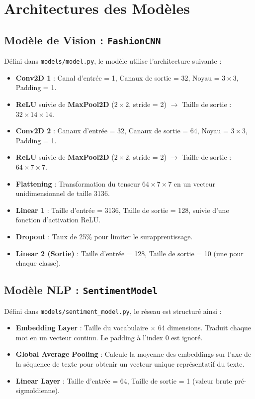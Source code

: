 \documentclass[12pt,a4paper,oneside]{report}
\begin{document}
\section{Architectures des Modèles}

\subsection{Modèle de Vision : \texttt{FashionCNN}}
Défini dans \texttt{models/model.py}, le modèle utilise l'architecture suivante :
\begin{itemize}
    \item \textbf{Conv2D 1} : Canal d'entrée = 1, Canaux de sortie = 32, Noyau = $3\times3$, Padding = 1.
    \item \textbf{ReLU} suivie de \textbf{MaxPool2D} ($2\times2$, stride = 2) $\to$ Taille de sortie : $32 \times 14 \times 14$.
    \item \textbf{Conv2D 2} : Canaux d'entrée = 32, Canaux de sortie = 64, Noyau = $3\times3$, Padding = 1.
    \item \textbf{ReLU} suivie de \textbf{MaxPool2D} ($2\times2$, stride = 2) $\to$ Taille de sortie : $64 \times 7 \times 7$.
    \item \textbf{Flattening} : Transformation du tenseur $64 \times 7 \times 7$ en un vecteur unidimensionnel de taille 3136.
    \item \textbf{Linear 1} : Taille d'entrée = 3136, Taille de sortie = 128, suivie d'une fonction d'activation ReLU.
    \item \textbf{Dropout} : Taux de 25\% pour limiter le surapprentissage.
    \item \textbf{Linear 2 (Sortie)} : Taille d'entrée = 128, Taille de sortie = 10 (une pour chaque classe).
\end{itemize}

\subsection{Modèle NLP : \texttt{SentimentModel}}
Défini dans \texttt{models/sentiment_model.py}, le réseau est structuré ainsi :
\begin{itemize}
    \item \textbf{Embedding Layer} : Taille du vocabulaire $\times$ 64 dimensions. Traduit chaque mot en un vecteur continu. Le padding à l'index 0 est ignoré.
    \item \textbf{Global Average Pooling} : Calcule la moyenne des embeddings sur l'axe de la séquence de texte pour obtenir un vecteur unique représentatif du texte.
    \item \textbf{Linear Layer} : Taille d'entrée = 64, Taille de sortie = 1 (valeur brute pré-sigmoïdienne).
\end{itemize}
\end{document}
